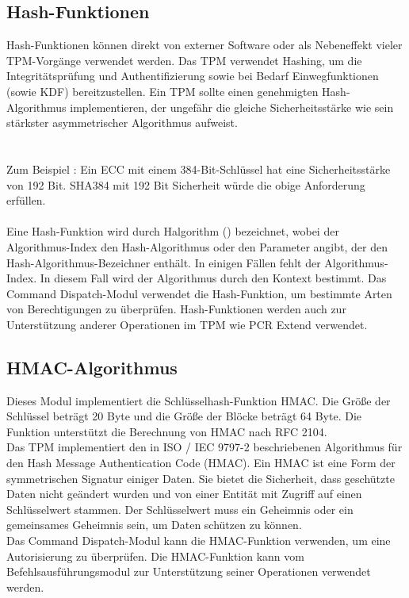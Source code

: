 \subsection{Hash-Funktionen}
Hash-Funktionen können direkt von externer Software oder als Nebeneffekt vieler TPM-Vorgänge verwendet werden. Das TPM verwendet Hashing, um die Integritätsprüfung und Authentifizierung sowie bei Bedarf Einwegfunktionen (sowie KDF) bereitzustellen.
Ein TPM sollte einen genehmigten Hash-Algorithmus implementieren, der ungefähr die gleiche Sicherheitsstärke wie sein stärkster asymmetrischer Algorithmus aufweist.
\\  \\ \\
Zum Beispiel : 
Ein ECC mit einem 384-Bit-Schlüssel hat eine Sicherheitsstärke von 192 Bit. SHA384 mit 192 Bit Sicherheit würde die obige Anforderung erfüllen.
\\ \\
Eine Hash-Funktion wird durch Halgorithm () bezeichnet, wobei der Algorithmus-Index den Hash-Algorithmus oder den Parameter angibt, der den Hash-Algorithmus-Bezeichner enthält. In einigen Fällen fehlt der Algorithmus-Index. In diesem Fall wird der Algorithmus durch den Kontext bestimmt.
Das Command Dispatch-Modul verwendet die Hash-Funktion, um bestimmte Arten von Berechtigungen zu überprüfen. Hash-Funktionen werden auch zur Unterstützung anderer Operationen im TPM wie PCR Extend verwendet.

\subsection{HMAC-Algorithmus}

Dieses Modul implementiert die Schlüsselhash-Funktion HMAC. Die Größe der Schlüssel beträgt 20 Byte und die Größe der Blöcke beträgt 64 Byte.
Die Funktion unterstützt die Berechnung von HMAC nach RFC 2104. \\
Das TPM implementiert den in ISO / IEC 9797-2 beschriebenen Algorithmus für den Hash Message Authentication Code (HMAC).
Ein HMAC ist eine Form der symmetrischen Signatur einiger Daten. Sie bietet die Sicherheit, dass geschützte Daten nicht geändert wurden und von einer Entität mit Zugriff auf einen Schlüsselwert stammen. Der Schlüsselwert muss ein Geheimnis oder ein gemeinsames Geheimnis sein, um Daten schützen zu können. \\
Das Command Dispatch-Modul kann die HMAC-Funktion verwenden, um eine Autorisierung zu überprüfen. Die HMAC-Funktion kann vom Befehlsausführungsmodul zur Unterstützung seiner Operationen verwendet werden.

